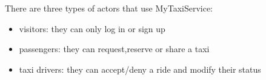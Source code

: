 There are three types of actors that use MyTaxiService:
\begin{itemize}
	\item visitors: they can only log in or sign up
	
	\item passengers: they can request,reserve or share a taxi
	
	\item taxi drivers: they can accept/deny a ride and modify their status
	
\end{itemize}